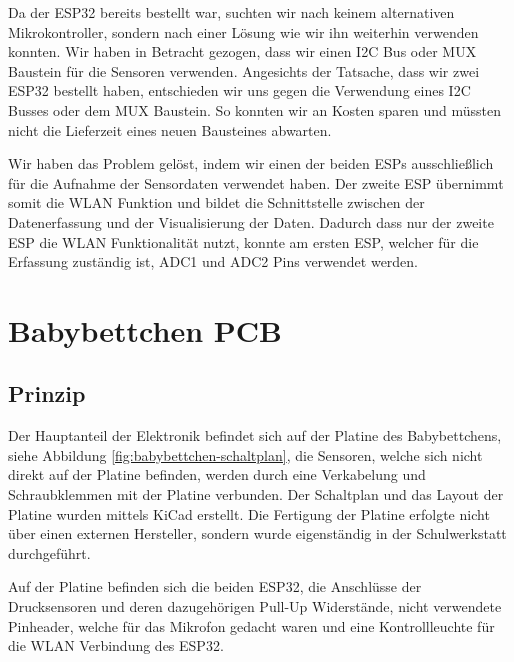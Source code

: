 \par\vspace{1em}

\noindent
Da der ESP32 bereits bestellt war, suchten wir nach keinem alternativen Mikrokontroller, sondern nach einer Lösung wie wir ihn weiterhin verwenden konnten. Wir haben in Betracht gezogen, dass wir einen I2C Bus oder MUX Baustein für die Sensoren verwenden. Angesichts der Tatsache, dass wir zwei ESP32 bestellt haben, entschieden wir uns gegen die Verwendung eines I2C Busses oder dem MUX Baustein. So konnten wir an Kosten sparen und müssten nicht die Lieferzeit eines neuen Bausteines abwarten.

\par\vspace{1em}

\noindent
Wir haben das Problem gelöst, indem wir einen der beiden ESPs ausschließlich für die Aufnahme der Sensordaten verwendet haben. Der zweite ESP übernimmt somit die WLAN Funktion und bildet die Schnittstelle zwischen der Datenerfassung und der Visualisierung der Daten. Dadurch dass nur der zweite ESP die WLAN Funktionalität nutzt, konnte am ersten ESP, welcher für die Erfassung zuständig ist,  ADC1 und ADC2 Pins verwendet werden.

\newpage

\section[Babybettchen PCB]{Babybettchen PCB\authorlinda}
\subsection{Prinzip}
Der Hauptanteil der Elektronik befindet sich auf der Platine des Babybettchens, siehe Abbildung \ref{fig:babybettchen-schaltplan}, die Sensoren, welche sich nicht direkt auf der Platine befinden,
werden durch eine Verkabelung und Schraubklemmen mit der Platine verbunden. Der Schaltplan und das Layout der Platine wurden mittels KiCad erstellt. Die Fertigung der Platine erfolgte nicht über einen externen Hersteller,
sondern wurde eigenständig in der Schulwerkstatt durchgeführt. 

\par\vspace{1em}

\noindent
Auf der Platine befinden sich die beiden ESP32, die Anschlüsse der Drucksensoren und deren dazugehörigen Pull-Up Widerstände, nicht verwendete Pinheader, welche für das Mikrofon gedacht waren und eine Kontrollleuchte für die WLAN Verbindung des ESP32.

